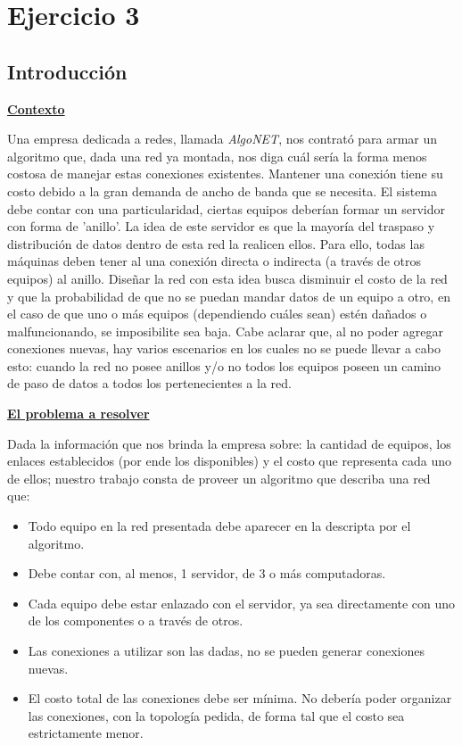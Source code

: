 \section{Ejercicio 3}
\subsection{Introducción}

\noindent \textbf{\underline{Contexto}}

Una empresa dedicada a redes, llamada \textit{AlgoNET}, nos contrató para armar un algoritmo que, dada una red ya montada, nos diga cuál sería la forma menos costosa de manejar estas conexiones existentes. Mantener una conexión tiene su costo debido a la gran demanda de ancho de banda que se necesita. El sistema debe contar con una particularidad, ciertas equipos deberían formar un servidor con forma de 'anillo'. La idea de este servidor es que la mayoría del traspaso y distribución de datos dentro de esta red la realicen ellos. Para ello, todas las máquinas deben tener al una conexión directa o indirecta (a través de otros equipos) al anillo. Diseñar la red con esta idea busca disminuir el costo de la red y que la probabilidad de que no se puedan mandar datos de un equipo a otro, en el caso de que uno o más equipos (dependiendo cuáles sean) estén dañados o malfuncionando, se imposibilite sea baja. Cabe aclarar que, al no poder agregar conexiones nuevas, hay varios escenarios en los cuales no se puede llevar a cabo esto: cuando la red no posee anillos y/o no todos los equipos poseen un camino de paso de datos a todos los pertenecientes a la red.

\noindent \textbf{\underline{El problema a resolver}}

Dada la información que nos brinda la empresa sobre: la cantidad de equipos, los enlaces establecidos (por ende los disponibles) y el costo que representa cada uno de ellos; nuestro trabajo consta de proveer un algoritmo que describa una red que:

\begin{itemize}
\item Todo equipo en la red presentada debe aparecer en la descripta por el algoritmo.
\item Debe contar con, al menos, 1 servidor, de 3 o más computadoras.
\item Cada equipo debe estar enlazado con el servidor, ya sea directamente con uno de los componentes o a través de otros.
\item Las conexiones a utilizar son las dadas, no se pueden generar conexiones nuevas.
\item El costo total de las conexiones debe ser mínima. No debería poder organizar las conexiones, con la topología pedida, de forma tal que el costo sea estrictamente menor.
\end{itemize}

